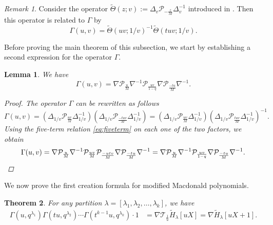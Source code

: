 \documentclass[12pt]{amsart}
\newtheorem{thm}{Theorem}[section]
\newtheorem{lem}[thm]{Lemma}
\theoremstyle{remark}
\newtheorem{rmq}{Remark}
\newcommand{\Pop}{\mathcal{P}}
\newcommand{\Top}{\mathcal{T}}
\begin{document}
\begin{rmq}
Consider the operator $\tilde{\Theta}(z;v):=\Delta_v \Pop_{-\frac{z}{M}} \Delta_v^{-1}$ introduced in \cite{DAdderioIraciVWyngaerd21}. Then this operator is related to $\Gamma$ by
\[\Gamma(u,v)=\tilde{\Theta}(uv;1/v)^{-1}\tilde{\Theta}(tuv;1/v).\]
\end{rmq}

Before proving the main theorem of this subsection, we start by establishing a second expression for the operator $\Gamma$.   
\begin{lem}\label{lem Gamma}
We have
$$\Gamma(u,v)=\nabla \Pop_{\frac{u}{M}}\nabla^{-1}\Pop_{\frac{uv}{1-q}}\nabla \Pop_{\frac{-tu}{M}}\nabla^{-1}.$$
\begin{proof}
    The operator $\Gamma$ can be rewritten as follows 
$$\Gamma(u,v)=\left(\Delta_{1/v}\Pop_{\frac{uv}{M}}\Delta_{1/v}^{-1}\right)\left(\Delta_{1/v}\Pop_{\frac{-tuv}{M}}\Delta_{1/v}^{-1}\right)=\left(\Delta_{1/v}\Pop_{\frac{uv}{M}}\Delta_{1/v}^{-1}\right)\left(\Delta_{1/v}\Pop_{\frac{tuv}{M}}\Delta_{1/v}^{-1}\right)^{-1}.$$
Using the five-term relation \eqref{eq:fiveterm} on each one of the two factors, we obtain 
\begin{equation*}
  \Gamma(u,v)=\nabla \Pop_{\frac{u}{M}}\nabla^{-1}\Pop_{\frac{uv}{M}}\Pop_{\frac{-utv}{M}}\nabla \Pop_{\frac{-tu}{M}}\nabla^{-1}=\nabla \Pop_{\frac{u}{M}}\nabla^{-1}\Pop_{\frac{uv}{1-q}}\nabla \Pop_{\frac{-tu}{M}}\nabla^{-1}.\qedhere  
\end{equation*}
\end{proof}
\end{lem}

\noindent We now prove the first creation formula for modified Macdonald polynomials.

\begin{thm}\label{thm creation modified 2}
	For any partition $\lambda=[\lambda_1,\lambda_2,\dots,\lambda_{k}]$, we have
	\begin{align}\label{eq creation modified 2}
\Gamma(u,q^{\lambda_1})\Gamma(tu,q^{\lambda_2})\cdots \Gamma(t^{k-1}u,q^{\lambda_{k}})\cdot 1 & =\nabla \Top_{\frac{1}{u}} \widetilde{H}_\lambda[uX]=\nabla \widetilde{H}_\lambda[uX+1].
	\end{align}
\end{thm}
\end{document}
